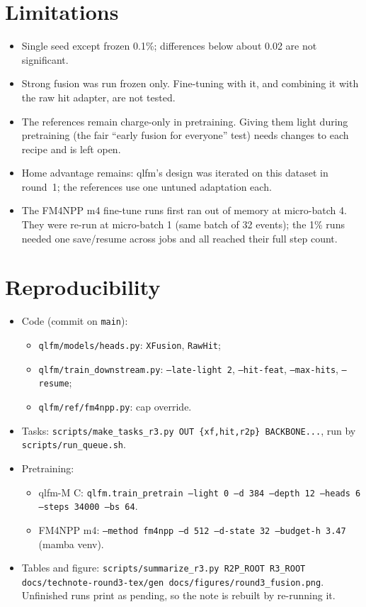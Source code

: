 \documentclass[11pt,a4paper]{article}
\newcommand{\code}[1]{\texttt{\small #1}}
\newcommand{\pend}{{\color{red!70!black}\scriptsize pending}}
\begin{document}
\section{Limitations}
\begin{itemize}[leftmargin=*]
\item Single seed except frozen 0.1\%; differences below about 0.02 are not significant.
\item Strong fusion was run frozen only. Fine-tuning with it, and combining it with the raw hit adapter, are not tested.
\item The references remain charge-only in pretraining. Giving them light during pretraining (the fair ``early fusion for everyone'' test) needs changes to each recipe and is left open.
\item Home advantage remains: qlfm's design was iterated on this dataset in round~1; the references use one untuned adaptation each.
\item The FM4NPP m4 fine-tune runs first ran out of memory at micro-batch 4. They were re-run at micro-batch 1 (same batch of 32 events); the 1\% runs needed one save/resume across jobs and all reached their full step count.
\end{itemize}

\section{Reproducibility}
\sloppy
\begin{itemize}[leftmargin=*]
\item Code (commit on \code{main}):
  \begin{itemize}
    \item \code{qlfm/models/heads.py}: \code{XFusion}, \code{RawHit};
    \item \code{qlfm/train\_downstream.py}: \code{--late-light 2}, \code{--hit-feat}, \code{--max-hits}, \code{--resume};
    \item \code{qlfm/ref/fm4npp.py}: cap override.
  \end{itemize}
\item Tasks: \code{scripts/make\_tasks\_r3.py OUT \{xf,hit,r2p\} BACKBONE...}, run by \code{scripts/run\_queue.sh}.
\item Pretraining:
  \begin{itemize}
    \item qlfm-M C: \code{qlfm.train\_pretrain --light 0 --d 384 --depth 12 --heads 6 --steps 34000 --bs 64}.
    \item FM4NPP m4: \code{--method fm4npp --d 512 --d-state 32 --budget-h 3.47} (mamba venv).
  \end{itemize}
\item Tables and figure: \code{scripts/summarize\_r3.py R2P\_ROOT R3\_ROOT docs/technote-round3-tex/gen docs/figures/round3\_fusion.png}. Unfinished runs print as \pend, so the note is rebuilt by re-running it.
\end{itemize}
\end{document}
